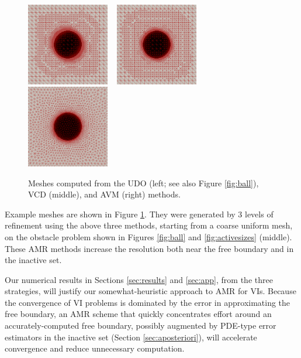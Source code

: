 \documentclass[]{interact}
\theoremstyle{plain}%
\theoremstyle{definition}
\theoremstyle{remark}
\begin{document}
\begin{figure}[ht]
\noindent \hspace{-1mm} \mbox{\includegraphics[width=0.32\textwidth]{static/sphereudo.png} \, \includegraphics[width=0.32\textwidth]{static/spherevcd.png} \,\,\includegraphics[width=0.32\textwidth]{static/sphereavm.png}}
\caption{Meshes computed from the UDO (left; see also Figure \ref{fig:ball}), VCD (middle), and AVM (right) methods.}
\label{fig:threeballmeshes}
\end{figure}

Example meshes are shown in Figure \ref{fig:threeballmeshes}.  They were generated by 3 levels of refinement using the above three methods, starting from a coarse uniform mesh, on the obstacle problem shown in Figures \ref{fig:ball} and \ref{fig:activesizes} (middle).  These AMR methods increase the resolution both near the free boundary and in the inactive set.

Our numerical results in Sections \ref{sec:results} and \ref{sec:app}, from the three strategies, will justify our somewhat-heuristic approach to AMR for VIs.  Because the convergence of VI problems is dominated by the error in approximating the free boundary, an AMR scheme that quickly concentrates effort around an accurately-computed free boundary, possibly augmented by PDE-type error estimators in the inactive set (Section \ref{sec:aposteriori}), will accelerate convergence and reduce unnecessary computation.
\end{document}
